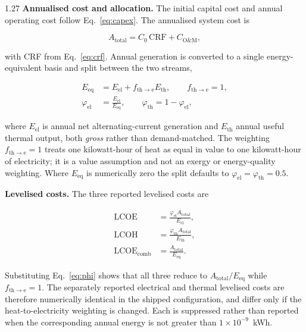 \documentclass[12pt,letterpaper]{article}
\begin{document}
\begin{spacing}{1.27}
\textbf{Annualised cost and allocation.} The initial capital cost and annual operating cost follow Eq.~\ref{eq:capex}. The annualised system cost is

\begin{equation}
A_{\mathrm{total}} = C_0\,\mathrm{CRF} + C_{\mathrm{O\&M}},
\label{eq:atotal}
\end{equation}

\noindent with CRF from Eq.~\ref{eq:crf}. Annual generation is converted to a single energy-equivalent basis and split between the two streams,

\begin{align}
E_{\mathrm{eq}} &= E_{\mathrm{el}} + f_{\mathrm{th}\rightarrow\mathrm{e}}E_{\mathrm{th}}, \qquad f_{\mathrm{th}\rightarrow\mathrm{e}} = 1, \label{eq:eeq}\\
\varphi_{\mathrm{el}} &= \frac{E_{\mathrm{el}}}{E_{\mathrm{eq}}}, \qquad \varphi_{\mathrm{th}} = 1-\varphi_{\mathrm{el}}, \label{eq:phi}
\end{align}

\noindent where $E_{\mathrm{el}}$ is annual net alternating-current generation and $E_{\mathrm{th}}$ annual useful thermal output, both \textit{gross} rather than demand-matched. The weighting $f_{\mathrm{th}\rightarrow\mathrm{e}}=1$ treats one kilowatt-hour of heat as equal in value to one kilowatt-hour of electricity; it is a value assumption and not an exergy or energy-quality weighting. Where $E_{\mathrm{eq}}$ is numerically zero the split defaults to $\varphi_{\mathrm{el}}=\varphi_{\mathrm{th}}=0.5$.\par

\vspace{0.15in}

\textbf{Levelised costs.} The three reported levelised costs are

\begin{align}
\mathrm{LCOE} &= \frac{\varphi_{\mathrm{el}}A_{\mathrm{total}}}{E_{\mathrm{el}}}, \label{eq:lcoe}\\
\mathrm{LCOH} &= \frac{\varphi_{\mathrm{th}}A_{\mathrm{total}}}{E_{\mathrm{th}}}, \label{eq:lcoh}\\
\mathrm{LCOE}_{\mathrm{comb}} &= \frac{A_{\mathrm{total}}}{E_{\mathrm{eq}}}. \label{eq:lcoecomb}
\end{align}

\noindent Substituting Eq.~\ref{eq:phi} shows that all three reduce to $A_{\mathrm{total}}/E_{\mathrm{eq}}$ while $f_{\mathrm{th}\rightarrow\mathrm{e}}=1$. The separately reported electrical and thermal levelised costs are therefore numerically identical in the shipped configuration, and differ only if the heat-to-electricity weighting is changed. Each is suppressed rather than reported when the corresponding annual energy is not greater than $1\times10^{-9}$~kWh.\par


\end{spacing}
\end{document}
